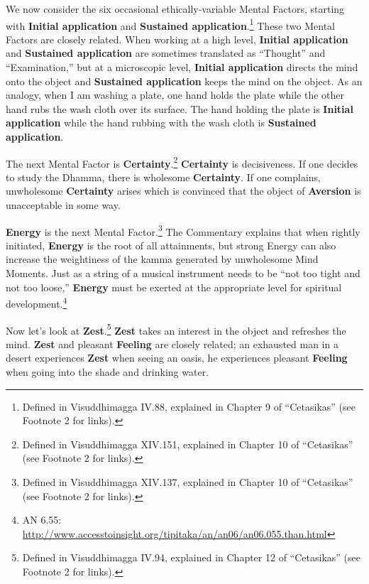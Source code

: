 We now consider the six occasional ethically-variable Mental Factors, starting with \textbf{Initial application} and \textbf{Sustained application}.\footnote{Defined in Visuddhimagga IV.88, explained in Chapter 9 of “Cetasikas” (see Footnote 2 for links).} These two Mental Factors are closely related. When working at a high level, \textbf{Initial application} and \textbf{Sustained application} are sometimes translated as “Thought” and “Examination,” but at a microscopic level, \textbf{Initial application} directs the mind onto the object and \textbf{Sustained application} keeps the mind on the object. As an analogy, when I am washing a plate, one hand holds the plate while the other hand rubs the wash cloth over its surface. The hand holding the plate is \textbf{Initial application} while the hand rubbing with the wash cloth is \textbf{Sustained application}.

The next Mental Factor is \textbf{Certainty}.\footnote{Defined in Visuddhimagga XIV.151, explained in Chapter 10 of “Cetasikas” (see Footnote 2 for links).} \textbf{Certainty} is decisiveness. If one decides to study the Dhamma, there is wholesome \textbf{Certainty}. If one complains, unwholesome \textbf{Certainty} arises which is convinced that the object of \textbf{Aversion} is unacceptable in some way.

\pagebreak

\textbf{Energy} is the next Mental Factor.\footnote{Defined in Visuddhimagga XIV.137, explained in Chapter 10 of “Cetasikas” (see Footnote 2 for links).} The Commentary explains that when rightly initiated, \textbf{Energy} is the root of all attainments, but strong Energy can also increase the weightiness of the kamma generated by unwholesome Mind Moments. Just as a string of a musical instrument needs to be “not too tight and not too loose,” \textbf{Energy} must be exerted at the appropriate level for spiritual development.\footnote{AN 6.55: \url{http://www.accesstoinsight.org/tipitaka/an/an06/an06.055.than.html}}

Now let’s look at \textbf{Zest}.\footnote{Defined in Visuddhimagga IV.94, explained in Chapter 12 of “Cetasikas” (see Footnote 2 for links).} \textbf{Zest} takes an interest in the object and refreshes the mind. \textbf{Zest} and pleasant \textbf{Feeling} are closely related; an exhausted man in a desert experiences \textbf{Zest} when seeing an oasis, he experiences pleasant \textbf{Feeling} when going into the shade and drinking water.

